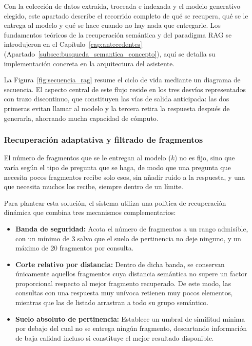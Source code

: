 Con la colección de datos extraída, troceada e indexada y el modelo generativo elegido, este apartado describe el recorrido completo de qué se recupera, qué se le entrega al modelo y qué se hace cuando no hay nada que entregarle. Los fundamentos teóricos de la recuperación semántica y del paradigma RAG se introdujeron en el Capítulo~\ref{cap:antecedentes}
  (Apartado~\ref{subsec:busqueda_semantica_concepto}), aquí se detalla su implementación concreta en la arquitectura del asistente.

  La Figura~\ref{fig:secuencia_rag} resume el ciclo de vida mediante un diagrama de secuencia. El aspecto central de este flujo reside en los tres desvíos representados con trazo discontinuo, que constituyen las vías de salida anticipada: las dos primeras evitan llamar al modelo y la tercera retira la respuesta después de generarla, ahorrando mucha capacidad de cómputo.




\subsubsection[Recuperación adaptativa y filtrado de fragmentos]{Recuperación adaptativa y filtrado de fragmentos}

El número de fragmentos que se le entregan al modelo ($k$) no es fijo, sino que varía según el tipo de pregunta que se haga, de modo que una pregunta que necesita pocos fragmentos recibe solo esos, sin añadir ruido a la respuesta, y una que necesita muchos los recibe, siempre dentro de un límite.

Para plantear esta solución, el sistema utiliza una política de recuperación dinámica que combina tres mecanismos complementarios:

\begin{itemize}
  \item \textbf{Banda de seguridad:} Acota el número de fragmentos a un rango admisible, con un mínimo de 3 salvo que el suelo de pertinencia no deje ninguno, y un máximo de 20 fragmentos por consulta.
  \item \textbf{Corte relativo por distancia:} Dentro de dicha banda, se conservan únicamente aquellos fragmentos cuya distancia semántica no supere un factor proporcional respecto al mejor fragmento recuperado. De este modo, las consultas con una respuesta muy unívoca retienen muy pocos elementos, mientras que las de listado arrastran a todo su grupo semántico.
  \item \textbf{Suelo absoluto de pertinencia:} Establece un umbral de similitud mínima por debajo del cual no se entrega ningún fragmento, descartando información de baja calidad incluso si constituye el mejor resultado disponible.
\end{itemize}


